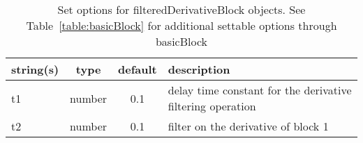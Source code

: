 \begin{table}[ht]
\centering
\begin{tabular}{p{5cm} c c p{7cm}}
\hline
string(s) & type & default & description \\
\hline
t1 & number & 0.1 & delay time constant for the derivative filtering operation\\
t2 & number & 0.1 & filter on the derivative of block 1\\
\hline
\end{tabular}
\caption{Set options for filteredDerivativeBlock objects. See Table~\ref{table:basicBlock} for additional settable options through basicBlock}
\label{table:filteredDerivativeBlock}
\end{table}

